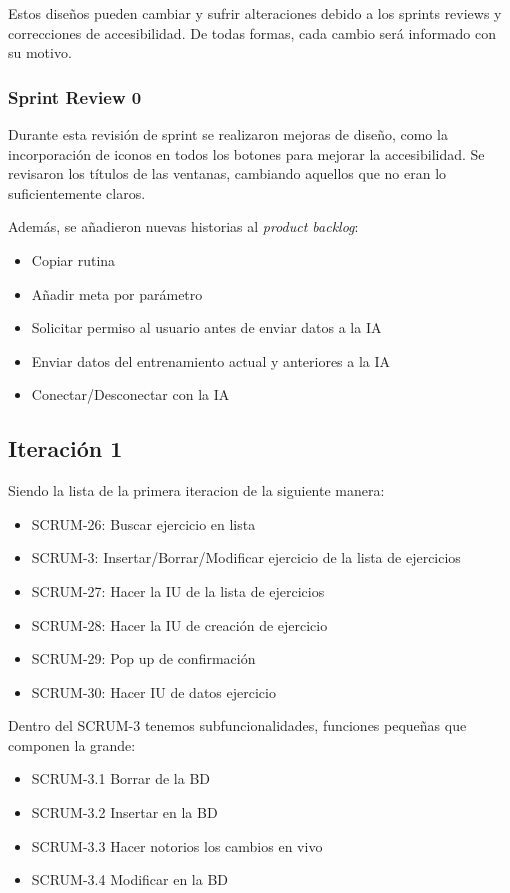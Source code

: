 Estos diseños pueden cambiar y sufrir alteraciones debido a los sprints reviews y correcciones de accesibilidad. De todas formas, cada cambio será informado con su motivo.

\subsubsection*{Sprint Review 0}
Durante esta revisi\'on de sprint se realizaron mejoras de dise\~no, como la incorporaci\'on de iconos en todos los botones para mejorar la accesibilidad. Se revisaron los t\'itulos de las ventanas, cambiando aquellos que no eran lo suficientemente claros.

Adem\'as, se a\~nadieron nuevas historias al \textit{product backlog}:

\begin{itemize}
  \item Copiar rutina
  \item A\~nadir meta por par\'ametro
  \item Solicitar permiso al usuario antes de enviar datos a la IA
  \item Enviar datos del entrenamiento actual y anteriores a la IA
  \item Conectar/Desconectar con la IA
\end{itemize}

\subsection*{Iteraci\'on 1}
Siendo la lista de la primera iteracion de la siguiente manera:

\begin{itemize}
    \item SCRUM-26: Buscar ejercicio en lista
    \item SCRUM-3: Insertar/Borrar/Modificar ejercicio de la lista de ejercicios
    \item SCRUM-27: Hacer la IU de la lista de ejercicios
    \item SCRUM-28: Hacer la IU de creación de ejercicio
    \item SCRUM-29: Pop up de confirmación
    \item SCRUM-30: Hacer IU de datos ejercicio
\end{itemize}

Dentro del SCRUM-3 tenemos subfuncionalidades, funciones pequeñas que componen la grande:

\begin{itemize}
	\item SCRUM-3.1 Borrar de la BD 
	\item SCRUM-3.2 Insertar en la BD
	\item SCRUM-3.3 Hacer notorios los cambios en vivo
	\item SCRUM-3.4 Modificar en la BD
\end{itemize}

